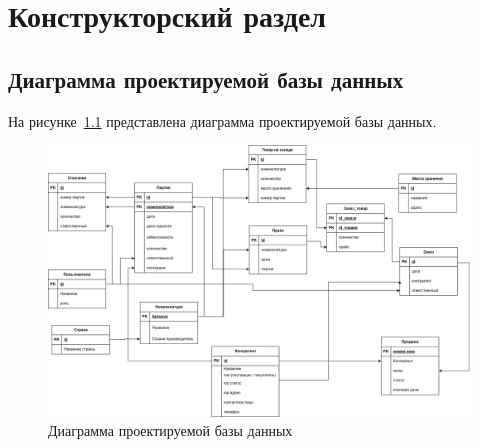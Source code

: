\chapter{Конструкторский раздел}
\section{Диаграмма проектируемой базы данных}
На рисунке~\ref{fig:BD} представлена диаграмма  проектируемой базы данных.

\begin{figure}
	\centering
	\includegraphics[width=1.5\linewidth, angle=-90]{pictures/BD_2}
	\caption{Диаграмма проектируемой базы данных}
	\label{fig:BD}
\end{figure}


